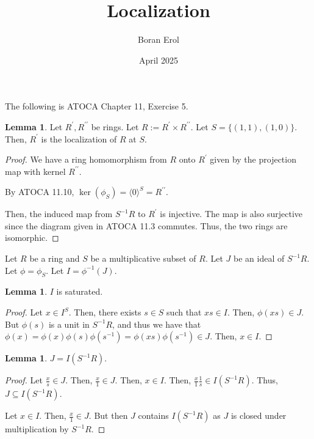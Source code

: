 \documentclass{article}
\title{Localization}
\date{April 2025}
\author{Boran Erol}
\theoremstyle{definition}
\newtheorem{lemma}[theorem]{Lemma}
\begin{document}
\maketitle

The following is ATOCA Chapter 11, Exercise 5.

\begin{lemma}
    Let $ R^{\prime },R^{\prime \prime} $ be rings.
    Let $ R := R^{\prime} \times R^{\prime \prime} $.
    Let $ S = \{ (1,1), (1,0) \} $.
    Then, $ R^{\prime} $ is the localization of $ R $ at $ S $.
\end{lemma}
\begin{proof}
    We have a ring homomorphism from $ R $ onto $ R^{\prime} $
    given by the projection map with kernel $ R^{\prime \prime} $.

    By ATOCA 11.10, $ \ker(\phi_{S}) = \langle 0 \rangle^{S} = R^{\prime \prime} $.

    Then, the induced map from $ S^{-1}R $ to $ R^{\prime} $ is injective.
    The map is also surjective since the diagram given in ATOCA 11.3 commutes.
    Thus, the two rings are isomorphic.
\end{proof}

Let $ R $ be a ring and $ S $ be a multiplicative subset of $ R $.
Let $ J $ be an ideal of $ S^{-1}R $.
Let $ \phi = \phi_{S} $.
Let $ I = \phi^{-1}(J) $.

\begin{lemma}
    $ I $ is saturated.
\end{lemma}
\begin{proof}
    Let $ x \in I^{S} $. Then, there exists $ s \in S $ such that $ xs \in I $. 
    Then, $ \phi(xs) \in J $. But $ \phi(s) $ is a unit in $ S^{-1}R $, and thus
    we have that $ \phi(x) = \phi(x) \phi(s) \phi(s^{-1}) = \phi(xs) \phi(s^{-1}) \in J $.
    Then, $ x \in I $.
\end{proof}

\begin{lemma}
    $ J = I (S^{-1}R) $.
\end{lemma}
\begin{proof}
    Let $ \frac{x}{s} \in J $. Then, $ \frac{x}{1} \in J $.
    Then, $ x \in I $. Then, $ \frac{x}{1} \frac{1}{s} \in I (S^{-1}R) $.
    Thus, $ J \subseteq I (S^{-1}R) $.

    Let $ x \in I $. Then, $ \frac{x}{1} \in J $.
    But then $ J $ contains $ I (S^{-1}R) $ as $ J $ is closed under multiplication by $ S^{-1}R $.
\end{proof}
\end{document}
